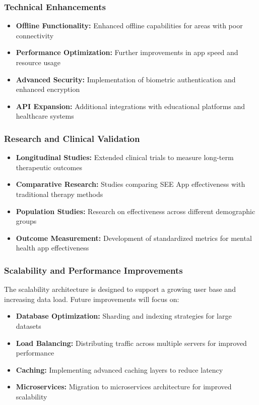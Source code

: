 ﻿\documentclass[12pt,a4paper]{article}
\newcommand{\subsectiontitle}[1]{\subsubsection{#1}}
\begin{document}
\subsectiontitle{Technical Enhancements}

\begin{minipage}{\linewidth}
\begin{itemize}
    \item \textbf{Offline Functionality:} Enhanced offline capabilities for areas with poor connectivity
    \item \textbf{Performance Optimization:} Further improvements in app speed and resource usage
    \item \textbf{Advanced Security:} Implementation of biometric authentication and enhanced encryption
    \item \textbf{API Expansion:} Additional integrations with educational platforms and healthcare systems
\end{itemize}
\end{minipage}

\subsectiontitle{Research and Clinical Validation}

\begin{minipage}{\linewidth}
\begin{itemize}
    \item \textbf{Longitudinal Studies:} Extended clinical trials to measure long-term therapeutic outcomes
    \item \textbf{Comparative Research:} Studies comparing SEE App effectiveness with traditional therapy methods
    \item \textbf{Population Studies:} Research on effectiveness across different demographic groups
    \item \textbf{Outcome Measurement:} Development of standardized metrics for mental health app effectiveness
\end{itemize}
\end{minipage}

\subsectiontitle{Scalability and Performance Improvements}

The scalability architecture is designed to support a growing user base and increasing data load. Future improvements will focus on:

\begin{minipage}{\linewidth}
\begin{itemize}
    \item \textbf{Database Optimization:} Sharding and indexing strategies for large datasets
    \item \textbf{Load Balancing:} Distributing traffic across multiple servers for improved performance
    \item \textbf{Caching:} Implementing advanced caching layers to reduce latency
    \item \textbf{Microservices:} Migration to microservices architecture for improved scalability
\end{itemize}
\end{minipage}
\end{document}
